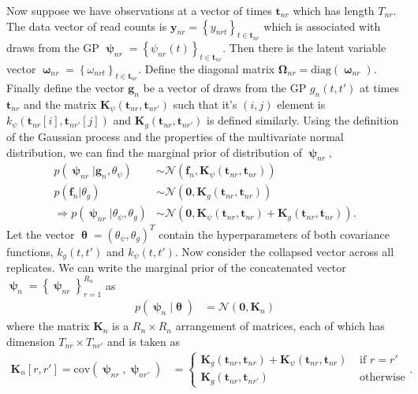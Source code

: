 \documentclass[11pt]{article}
\newcommand{\pN}{\mathcal{N}}
\newcommand{\1}{\mathbf{1}}
\newcommand{\0}{\mathbf{0}}
\newcommand{\f}{\mathbf{f}}
\newcommand{\K}{\mathbf{K}}
\newcommand{\g}{\mathbf{g}}
\newcommand{\y}{\mathbf{y}}
\begin{document}
Now suppose we have observations at a vector of times $\mathbf{t}_{nr}$ which has length $T_{nr}$. The data vector of read counts is $\y_{nr} = \left\{ y_{nrt} \right\}_{t\in\mathbf{t}_{nr}}$ which is associated with draws from the GP $\bm{\uppsi}_{nr} = \left\{ \psi_{nr}(t) \right\}_{t\in\mathbf{t}_{nr}}$. Then there is the latent variable vector $\bm{\upomega}_{nr} = \left\{ \omega_{nrt} \right\}_{t\in\mathbf{t}_{nr}}$. Define the diagonal matrix $\bm{\Omega}_{nr} = \text{diag}\left( \bm{\upomega}_{nr} \right).$ Finally define the vector $\g_n$ be a vector of draws from the GP $g_n(t, t')$ at times $\mathbf{t}_{nr}$ and the matrix $\K_\psi(\mathbf{t}_{nr}, \mathbf{t}_{nr'})$ such that it's $(i, j)$ element is $k_\psi(\mathbf{t}_{nr}[i], \mathbf{t}_{nr'}[j])$ and $\K_g(\mathbf{t}_{nr}, \mathbf{t}_{nr'})$ is defined similarly. Using the definition of the Gaussian process and the properties of the multivariate normal distribution, we can find the marginal prior of distribution of $\bm{\uppsi}_{nr},$  
%
%
%
\begin{align*}
	p(\bm{\uppsi}_{nr} | \g_{n}, \theta_{\psi}) &\sim \pN \left( \f_n, \K_{\psi}(\mathbf{t}_{nr}, \mathbf{t}_{nr}) \right) \\
	p(\f_n | \theta_{g})  &\sim \pN \left( \mathbf{0}, \K_g(\mathbf{t}_{nr}, \mathbf{t}_{nr}) \right) \\
	\Rightarrow p(\bm{\uppsi}_{nr} | \theta_{\psi}, \theta_g) &\sim \pN\left( \mathbf{0}, \K_{\psi}(\mathbf{t}_{nr}, \mathbf{t}_{nr}) + \K_{g}(\mathbf{t}_{nr}, \mathbf{t}_{nr}) \right).
\end{align*}
%
%
%
Let the vector $\bm{\uptheta} = (\theta_\psi, \theta_g)^T$ contain the hyperparameters of both covariance functions, $k_g(t, t')$ and $k_\psi(t, t')$. Now consider the collapsed vector across all replicates. We can write the marginal prior of the concatenated vector $\bm{\uppsi}_n = \left\{ \bm{\uppsi}_{nr} \right\}_{r=1}^{R_{n}}$ as 
%
%
%
\begin{align*}
	p(\bm{\uppsi}_n | \bm{\uptheta}) &= \pN(\mathbf{0}, \K_n)
\end{align*}
%
%
%
where the matrix $\K_n$ is a $R_n \times R_n$ arrangement of matrices, each of which has dimension $T_{nr} \times T_{nr'}$ and is taken as
%
%
%
\begin{align}
	\K_n[r, r'] = \text{cov}(\bm{\uppsi}_{nr}, \bm{\uppsi}_{nr'}) &= \begin{cases}
		\K_g(\mathbf{t}_{nr}, \mathbf{t}_{nr}) + \K_\psi(\mathbf{t}_{nr}, \mathbf{t}_{nr}) & \text{ if } r=r' \\
		\K_g(\mathbf{t}_{nr}, \mathbf{t}_{nr'}) & \text{ otherwise}
	\end{cases}. \label{covmat}
\end{align} 
\end{document}
